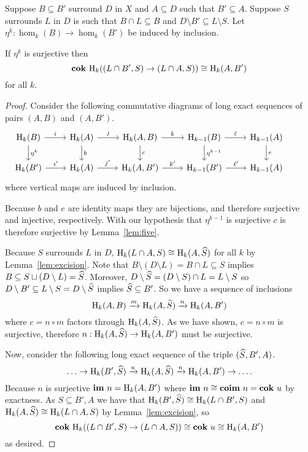\documentclass[12pt]{article}
\begin{document}
\begin{theorem}\label{thm:separate_iso_coker}
  Suppose $B\subseteq B'$ surround $D$ in $X$ and $A\subseteq D$ such that $B'\subseteq A$.
  Suppose $S$ surrounds $L$ in $D$ is such that $B\cap L\subseteq B$ and $D\setminus B'\subseteq L\setminus S$.
  Let $\eta^k : \hom_k(B)\to \hom_k(B')$ be induced by inclusion.

  If $\eta^k$ is surjective then
  \[\mathbf{cok}~\mathrm{H}_k((L\cap B', S)\to (L\cap A, S))\cong \mathrm{H}_k(A, B')\]
  for all $k$.
\end{theorem}
\begin{proof}
  Consider the following commutative diagrams of long exact sequences of pairs $(A, B)$ and $(A, B')$.
  \begin{equation}\begin{tikzcd}\label{dgm:separate_iso}
    \hom_k(B)\arrow{r}{i}\arrow{d}{\eta^k} &
    \hom_k(A)\arrow{r}{j}\arrow{d}{b} &
    \hom_k(A, B)\arrow{r}{k}\arrow{d}{c} &
    \hom_{k-1}(B)\arrow{r}{\ell}\arrow{d}{\eta^{k-1}} &
    \hom_{k-1}(A)\arrow{d}{e} &\\
    \hom_k(B')\arrow{r}{i'} &
    \hom_k(A)\arrow{r}{j'} &
    \hom_k(A, B')\arrow{r}{k'} &
    \hom_{k-1}(B')\arrow{r}{\ell'} &
    \hom_{k-1}(A)
  \end{tikzcd}\end{equation}
  where vertical maps are induced by inclusion.

  Because $b$ and $e$ are identity maps they are bijections, and therefore surjective and injective, respectively.
  With our hypothesis that $\eta^{k-1}$ is surjective $c$ is therefore surjective by Lemma~\ref{lem:five}.

  Because $S$ surrounds $L$ in $D$, $\mathrm{H}_k(L\cap A, S)\cong \mathrm{H}_k(A, \widehat{S})$ for all $k$ by Lemma~\ref{lem:excision}.
  Note that $B\setminus (D\setminus L) = B\cap L\subseteq S$ implies $B\subseteq S\sqcup(D\setminus L) = \widehat{S}$.
  Moreover, $D\setminus \widehat{S} = (D\setminus S)\cap L = L\setminus S$ so $D\setminus B'\subseteq L\setminus S = D\setminus\widehat{S}$ implies $\widehat{S}\subseteq B'$.
  So we have a sequence of inclusions
  \[ \mathrm{H}_k(A, B)\xrightarrow{m}\mathrm{H}_k(A, \widehat{S})\xrightarrow{n}\mathrm{H}_k(A, B')\]
  where $c = n\circ m$ factors through $\mathrm{H}_k(A, \widehat{S})$.
  As we have shown, $c = n\circ m$ is surjective, therefore $n : \mathrm{H}_k(A, \widehat{S}) \to \mathrm{H}_k(A, B')$ must be surjective.

  Now, consider the following long exact sequence of the triple $(\widehat{S}, B', A)$.
  \[\ldots\to \mathrm{H}_k(B', \widehat{S})\xrightarrow{u} \mathrm{H}_k(A, \widehat{S})\xrightarrow{n}\mathrm{H}_k(A, B')\to\ldots.\]
  Because $n$ is surjective $\mathbf{im}~n = \mathrm{H}_k(A, B')$ where $\mathbf{im}~n\cong \mathbf{coim}~n = \mathbf{cok}~u$ by exactness.
  As $S\subseteq B', A$ we have that $\mathrm{H}_k(B', \widehat{S})\cong \mathrm{H}_k(L\cap B', S)$ and $\mathrm{H}_k(A, \widehat{S})\cong \mathrm{H}_k(L\cap A, S)$ by Lemma~\ref{lem:excision}, so
  \[ \mathbf{cok}~\mathrm{H}_k((L\cap B', S)\to (L\cap A, S))\cong \mathbf{cok}~u\cong \mathrm{H}_k(A, B') \]
  as desired.
\end{proof}
\end{document}
